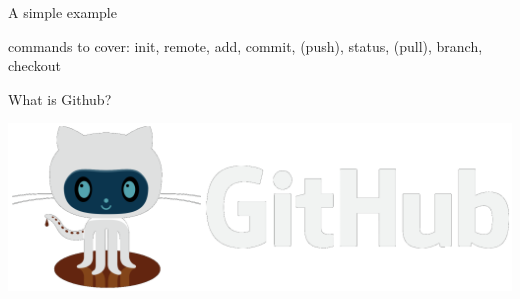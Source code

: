 \documentclass[12pt]{beamer}
\begin{document}
\begin{frame}

	\begin{flushright}
	\Large \textcolor{boss2}{A simple example} 
	\end{flushright}

commands to cover: init, remote, add, commit, (push), status, (pull), branch, checkout

\end{frame}










































\begin{frame}

	\begin{flushright}
	\Large \textcolor{boss2}{What is Github?} 
	\end{flushright}

  \begin{center}
    \includegraphics[width=\textwidth]{figs/github.png}
  \end{center}

\end{frame}
\end{document}

